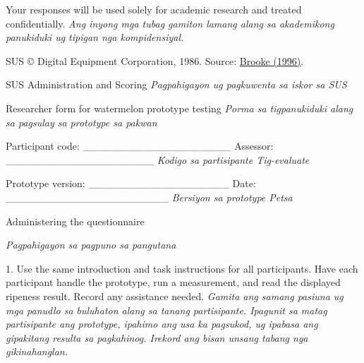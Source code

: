 Your responses will be used solely for academic research and treated confidentially. \textit{Ang inyong mga tubag gamiton lamang alang sa akademikong panukiduki ug tipigan nga kompidensiyal.}

SUS © Digital Equipment Corporation, 1986. Source: \hyperlink{cite.brooke1996}{Brooke (1996)}.

SUS Administration and Scoring \textit{Pagpahigayon ug pagkuwenta sa iskor sa SUS}

Researcher form for watermelon prototype testing \textit{Porma sa tigpanukiduki alang sa pagsulay sa prototype sa pakwan}

Participant code: \_\allowbreak{}\_\allowbreak{}\_\allowbreak{}\_\allowbreak{}\_\allowbreak{}\_\allowbreak{}\_\allowbreak{}\_\allowbreak{}\_\allowbreak{}\_\allowbreak{}\_\allowbreak{}\_\allowbreak{}\_\allowbreak{}\_\allowbreak{}\_\allowbreak{}\_\allowbreak{}\_\allowbreak{}\_\allowbreak{}\_\allowbreak{}\_\allowbreak{} Assessor: \_\allowbreak{}\_\allowbreak{}\_\allowbreak{}\_\allowbreak{}\_\allowbreak{}\_\allowbreak{}\_\allowbreak{}\_\allowbreak{}\_\allowbreak{}\_\allowbreak{}\_\allowbreak{}\_\allowbreak{}\_\allowbreak{}\_\allowbreak{}\_\allowbreak{}\_\allowbreak{}\_\allowbreak{}\_\allowbreak{}\_\allowbreak{}\_\allowbreak{} \textit{Kodigo sa partisipante Tig-evaluate}

Prototype version: \_\allowbreak{}\_\allowbreak{}\_\allowbreak{}\_\allowbreak{}\_\allowbreak{}\_\allowbreak{}\_\allowbreak{}\_\allowbreak{}\_\allowbreak{}\_\allowbreak{}\_\allowbreak{}\_\allowbreak{}\_\allowbreak{}\_\allowbreak{}\_\allowbreak{}\_\allowbreak{}\_\allowbreak{}\_\allowbreak{}\_\allowbreak{} Date: \_\allowbreak{}\_\allowbreak{}\_\allowbreak{}\_\allowbreak{}\_\allowbreak{}\_\allowbreak{}\_\allowbreak{}\_\allowbreak{}\_\allowbreak{}\_\allowbreak{}\_\allowbreak{}\_\allowbreak{}\_\allowbreak{}\_\allowbreak{}\_\allowbreak{}\_\allowbreak{}\_\allowbreak{}\_\allowbreak{}\_\allowbreak{}\_\allowbreak{}\_\allowbreak{}\_\allowbreak{} \textit{Bersiyon sa prototype Petsa}

Administering the questionnaire

\textit{Pagpahigayon sa pagpuno sa pangutana}

1. Use the same introduction and task instructions for all participants. Have each participant handle the prototype, run a measurement, and read the displayed ripeness result. Record any assistance needed. \textit{Gamita ang samang pasiuna ug mga panudlo sa buluhaton alang sa tanang partisipante. Ipagunit sa matag partisipante ang prototype, ipahimo ang usa ka pagsukod, ug ipabasa ang gipakitang resulta sa pagkahinog. Irekord ang bisan unsang tabang nga gikinahanglan.}

